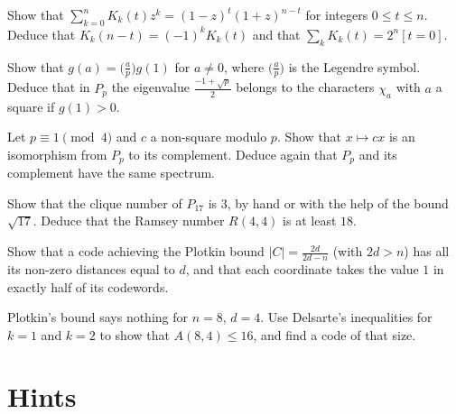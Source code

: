 \begin{exercise}[$\star$]\label{linear:ex:krawgen}
Show that $\sum_{k=0}^nK_k(t)z^k=(1-z)^t(1+z)^{n-t}$ for integers $0\le t\le n$. Deduce that $K_k(n-t)=(-1)^kK_k(t)$ and that
$\sum_kK_k(t)=2^n[t=0]$.
\end{exercise}

\begin{exercise}[$\star\star$]\label{linear:ex:gausssign}
Show that $g(a)=\bigl(\frac ap\bigr)g(1)$ for $a\ne0$, where $\bigl(\frac ap\bigr)$ is the Legendre symbol. Deduce that in $P_p$ the
eigenvalue $\frac{-1+\sqrt p}2$ belongs to the characters $\chi_a$ with $a$ a square if $g(1)>0$.
\end{exercise}

\begin{exercise}[$\star$]\label{linear:ex:paleyself}
Let $p\equiv1\pmod4$ and $c$ a non-square modulo $p$. Show that $x\mapsto cx$ is an isomorphism from $P_p$ to its complement.
Deduce again that $P_p$ and its complement have the same spectrum.
\end{exercise}

\begin{exercise}[$\star\star$]\label{linear:ex:paleyramsey}
Show that the clique number of $P_{17}$ is $3$, by hand or with the help of the bound $\sqrt{17}$. Deduce that the Ramsey number
$R(4,4)$ is at least $18$.
\end{exercise}

\begin{exercise}[$\star\star$]\label{linear:ex:plotkinsharp}
Show that a code achieving the Plotkin bound $|C|=\frac{2d}{2d-n}$ (with $2d>n$) has all its non-zero distances equal to $d$, and
that each coordinate takes the value $1$ in exactly half of its codewords.
\end{exercise}

\begin{exercise}[$\star\star\star$]\label{linear:ex:lpthree}
Plotkin's bound says nothing for $n=8$, $d=4$. Use Delsarte's inequalities for $k=1$ and $k=2$ to show that $A(8,4)\le16$, and find
a code of that size.
\end{exercise}

\section{Hints}

